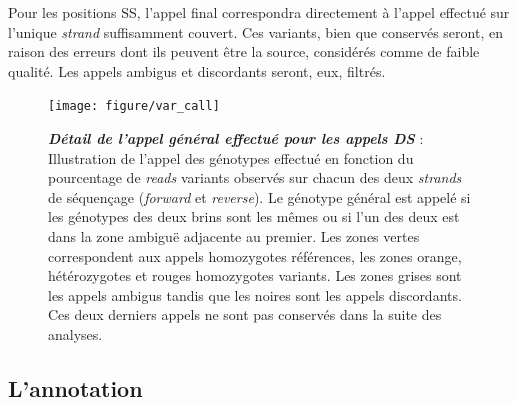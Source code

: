 \documentclass[12pt,a4paper,twoside]{ugathesis}
\theoremstyle{definition}
\theoremstyle{definition}
\theoremstyle{definition}
\theoremstyle{remark}
\begin{document}
Pour les positions SS, l'appel final correspondra directement à l'appel
effectué sur l'unique \emph{strand} suffisamment couvert. Ces variants,
bien que conservés seront, en raison des erreurs dont ils peuvent être
la source, considérés comme de faible qualité. Les appels ambigus et
discordants seront, eux, filtrés.

\newpage

\begin{figure}

{\centering \texttt{[image: figure/var\_call]} 

}

\caption[Détail de l'appel général effectué pour les appels DS]{\textbf{\emph{Détail de l'appel général effectué pour
les appels DS}} : Illustration de l'appel des génotypes effectué en
fonction du pourcentage de \emph{reads} variants observés sur chacun des
deux \emph{strands} de séquençage (\emph{forward} et \emph{reverse}). Le
génotype général est appelé si les génotypes des deux brins sont les
mêmes ou si l'un des deux est dans la zone ambiguë adjacente au premier.
Les zones vertes correspondent aux appels homozygotes références, les
zones orange, hétérozygotes et rouges homozygotes variants. Les zones
grises sont les appels ambigus tandis que les noires sont les appels
discordants. Ces deux derniers appels ne sont pas conservés dans la
suite des analyses.}\label{fig:picvarcall}
\end{figure}













\newpage

\subsection{L'annotation}\label{lannotation}
\end{document}
